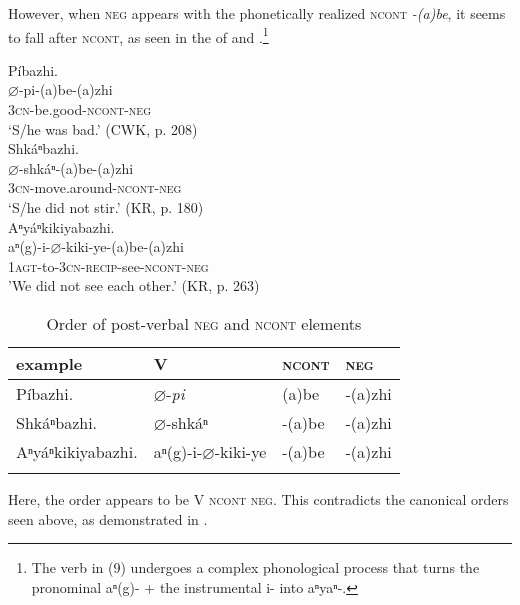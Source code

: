 \documentclass[output=paper]{LSP/langsci}
\begin{document}
However, when \textsc{neg} appears with the phonetically realized \textsc{ncont} \textit{-(a)be}, it seems to fall after \textsc{ncont}, as seen in the  of  and .\footnote{The verb in (9) undergoes a complex phonological process that turns the pronominal aⁿ(g)- + the instrumental i- into aⁿyaⁿ-.} 

\ea\label{negncont}
  \ea \label{negncont1} Píbazhi.\\
  \gll   $\varnothing$-pi-(a)be-(a)zhi\\
  \textsc{3cn}-be.good-\textsc{ncont}-\textsc{neg}\\
  \glt `S/he was bad.' (CWK, p. 208) \\ 
  
  \ex  \label{negncont2}Shkáⁿbazhi.\\
  \gll   $\varnothing$-shkáⁿ-(a)be-(a)zhi \\
  \textsc{3cn}-move.around-\textsc{ncont}-\textsc{neg} \\
  \glt `S/he did not stir.' (KR, p. 180) \\ 
  
  \ex  \label{negncont3} Aⁿyáⁿkikiyabazhi.\\
  \gll   aⁿ(g)-i-$\varnothing$-kiki-ye-(a)be-(a)zhi \\
  \textsc{1agt}-to-\textsc{3cn}-\textsc{recip}-see-\textsc{ncont}-\textsc{neg} \\
  \glt 'We did not see each other.' (KR, p. 263) \\ 
\z 
\z

\begin{table}
\caption{Order of post-verbal \textsc{neg} and \textsc{ncont} elements} \label{tablenegncont}
\begin{tabular}[h!]{ l l l l }
\lsptoprule
example & V & \textsc{ncont} & \textsc{neg} \\
\midrule
Píbazhi. & $\varnothing$-\textit{pi}	& (a)be	& -(a)zhi \\
Shkáⁿbazhi. & $\varnothing$-shkáⁿ & -(a)be & -(a)zhi \\
Aⁿyáⁿkikiyabazhi. & aⁿ(g)-i-$\varnothing$-kiki-ye & -(a)be & -(a)zhi \\
\lspbottomrule
\end{tabular}
\end{table}
 
Here, the order appears to be V \textsc{ncont neg}. This contradicts the canonical orders seen above, as demonstrated in .
\end{document}
